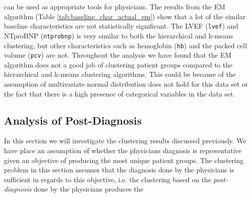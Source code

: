 \documentclass[../thesis.tex]{subfiles}
\begin{document}


\noindent can be used as appropriate tools for physicians. The results from the EM algorithm (Table \ref{tab:baseline_char_actual_em}) show that a lot of the similar baseline characteristics are not statistically significant. The LVEF (\texttt{lvef}) and NTproBNP (\texttt{ntprobnp}) is very similar to both the hierarchical and k-means clustering, but other characteristics such as hemoglobin (\texttt{hb}) and the packed cell volume (\texttt{pcv}) are not. Throughout the analysis we have found that the EM algorithm does not a good job of clustering patient groups compared to the hierarchical and k-means clustering algorithms. This could be because of the assumption of multivariate normal distribution does not hold for this data set or the fact that there is a high presence of categorical variables in the data set.

\subsection{Analysis of Post-Diagnosis}

\noindent In this section we will investigate the clustering results discussed previously. We have place an assumption of whether the physicians diagnosis is representative given an objective of producing the most unique patient groups. The clustering problem in this section assumes that the diagnosis done by the physicians is sufficient in regards to this objective, i.e. the clustering based on the \textit{post-diagnosis} done by the physicians produces the  


\end{document}

